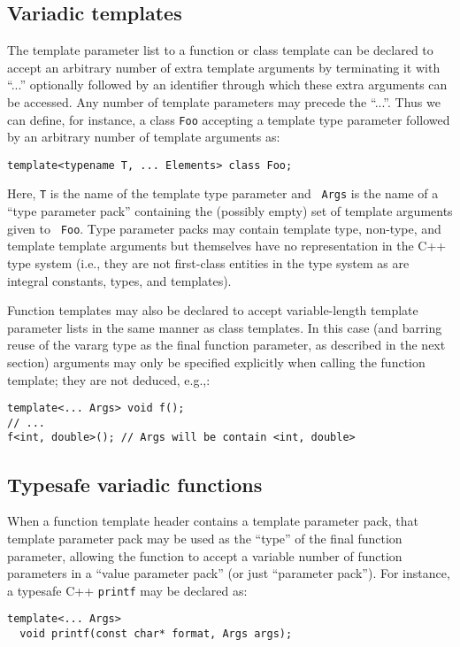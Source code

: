 \documentclass{article}
\begin{document}
\subsection{Variadic templates}
\par The template parameter list to a function or class template can
be declared to accept an arbitrary number of extra template arguments
by terminating it with ``...'' optionally followed by an identifier
through which these extra arguments can be accessed.
Any number of template
parameters may precede the ``...''. Thus we can define, for instance,
a class {\tt Foo} accepting a template type parameter followed by an
arbitrary number of template arguments as:
\begin{verbatim}
template<typename T, ... Elements> class Foo;
\end{verbatim}

Here, {\tt T} is the name of the template type parameter and {\tt
  Args} is the name of a ``type parameter pack'' containing
the (possibly empty) set of template arguments given to {\tt
  Foo}. Type parameter packs may contain template type, non-type, and
template template arguments but themselves have no representation in
the C++ type system (i.e., they are not first-class entities in the
type system as are integral constants, types, and templates).

Function templates may also be declared to accept variable-length
template parameter lists in the same manner as class templates. In
this case (and barring reuse of the vararg type as the final function
parameter, as described in the next section) arguments may only be
specified explicitly when calling the function template; they are not
deduced, e.g.,:

\begin{verbatim}
template<... Args> void f();
// ... 
f<int, double>(); // Args will be contain <int, double>
\end{verbatim}

\subsection{Typesafe variadic functions}
When a function template header contains a template parameter pack,
that template parameter pack may be used as the ``type'' of the final
function parameter, allowing the function to accept a variable number
of function parameters in a ``value parameter pack'' (or just
``parameter pack''). For instance, a typesafe C++ {\tt printf} may
be declared as:
\begin{verbatim}
template<... Args>
  void printf(const char* format, Args args);
\end{verbatim}
\end{document}
